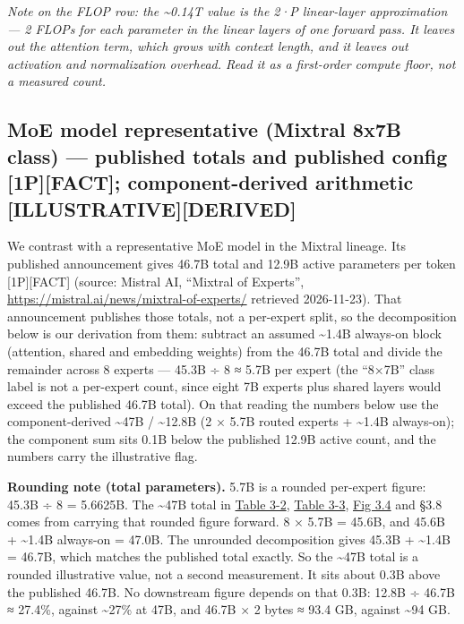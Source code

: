 \emph{Note on the FLOP row: the \textasciitilde0.14T value is the 2·P
linear-layer approximation --- 2 FLOPs for each parameter in the linear
layers of one forward pass. It leaves out the attention term, which
grows with context length, and it leaves out activation and
normalization overhead. Read it as a first-order compute floor, not a
measured count.}

\subsection{MoE model representative (Mixtral 8x7B class) --- published
totals and published config \mbox{{[}1P{]}}\hspace{0pt}\mbox{{[}FACT{]}}; component-derived
arithmetic
\mbox{{[}ILLUSTRATIVE{]}}\hspace{0pt}\mbox{{[}DERIVED{]}}}\label{moe-model-representative-mixtral-8x7b-class-published-totals-and-published-config-1pfact-component-derived-arithmetic-illustrativederived}

We contrast with a representative MoE model in the Mixtral lineage. Its
published announcement gives 46.7B total and 12.9B active parameters per
token \mbox{{[}1P{]}}\hspace{0pt}\mbox{{[}FACT{]}} (source: Mistral AI, ``Mixtral of Experts'',
\url{https://mistral.ai/news/mixtral-of-experts/} retrieved 2026-11-23). That
announcement publishes those totals, not a per-expert split, so the
decomposition below is our derivation from them: subtract an assumed
\textasciitilde1.4B always-on block (attention, shared and embedding
weights) from the 46.7B total and divide the remainder across 8 experts
--- 45.3B ÷ 8 ≈ 5.7B per expert (the ``8×7B'' class label is not a
per-expert count, since eight 7B experts plus shared layers would exceed
the published 46.7B total). On that reading the numbers below use the
component-derived \textasciitilde47B / \textasciitilde12.8B (2 × 5.7B
routed experts + \textasciitilde1.4B always-on); the component sum sits
0.1B below the published 12.9B active count, and the numbers carry the
illustrative flag.

\textbf{Rounding note (total parameters).} 5.7B is a rounded per-expert
figure: 45.3B ÷ 8 = 5.6625B. The \textasciitilde47B total in \hyperref[tab:3.2]{Table 3-2},
\hyperref[tab:3.3]{Table 3-3}, \hyperref[fig:3.4]{Fig 3.4} and §3.8 comes from carrying that rounded figure
forward. 8 × 5.7B = 45.6B, and 45.6B + \textasciitilde1.4B always-on =
47.0B. The unrounded decomposition gives 45.3B + \textasciitilde1.4B =
46.7B, which matches the published total exactly. So the
\textasciitilde47B total is a rounded illustrative value, not a second
measurement. It sits about 0.3B above the published 46.7B. No downstream
figure depends on that 0.3B: 12.8B ÷ 46.7B ≈ 27.4\%, against
\textasciitilde27\% at 47B, and 46.7B × 2 bytes ≈ 93.4 GB, against
\textasciitilde94 GB.


